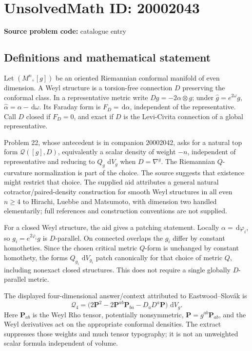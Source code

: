 \documentclass[11pt]{article}
\newcommand{\dd}{\,\mathrm{d}}
\begin{document}
\section*{UnsolvedMath ID: 20002043}
\textbf{Source problem code:} catalogue entry
\subsection{Definitions and mathematical statement}
Let \((M^n,[g])\) be an oriented Riemannian conformal manifold of even dimension. A Weyl structure is a torsion-free connection \(D\) preserving the conformal class. In a representative metric write \(Dg=-2\alpha\otimes g\); under \(\widehat g=e^{2\omega}g\), \(\widehat\alpha=\alpha-\dd\omega\). Its Faraday form is \(F_D=\dd\alpha\), independent of the representative. Call \(D\) closed if \(F_D=0\), and exact if \(D\) is the Levi-Civita connection of a global representative.

Problem 22, whose antecedent is in companion 20002042, asks for a natural top form \(\mathcal Q([g],D)\), equivalently a scalar density of weight \(-n\), independent of representative and reducing to \(Q_g\,\dd V_g\) when \(D=\nabla^g\). The Riemannian \(Q\)-curvature normalization is part of the choice. The source suggests that existence might restrict that choice. The supplied aid attributes a general natural cotractor/paired-density construction for smooth Weyl structures in all even \(n\geq4\) to Hirachi, Luebbe and Matsumoto, with dimension two handled elementarily; full references and construction conventions are not supplied.

For a closed Weyl structure, the aid gives a patching statement. Locally \(\alpha=\dd\varphi_i\), so \(g_i=e^{2\varphi_i}g\) is \(D\)-parallel. On connected overlaps the \(g_i\) differ by constant homotheties. Since the chosen critical metric \(Q\)-form is unchanged by constant homothety, the forms \(Q_{g_i}\,\dd V_{g_i}\) patch canonically for that choice of metric \(Q\), including nonexact closed structures. This does not require a single globally \(D\)-parallel metric.

The displayed four-dimensional answer/context attributed to Eastwood--Slov\'ak is
\[
\mathcal Q_4=\bigl(2\mathbf P^2-2\mathbf P^{ab}\mathbf P_{ba}-D_aD^a\mathbf P\bigr)\,\dd V_g.
\]
Here \(\mathbf P_{ab}\) is the Weyl Rho tensor, potentially nonsymmetric, \(\mathbf P=g^{ab}\mathbf P_{ab}\), and the Weyl derivatives act on the appropriate conformal densities. The extract suppresses those weights and much tensor typography; it is not an unweighted scalar formula independent of volume.
\end{document}
